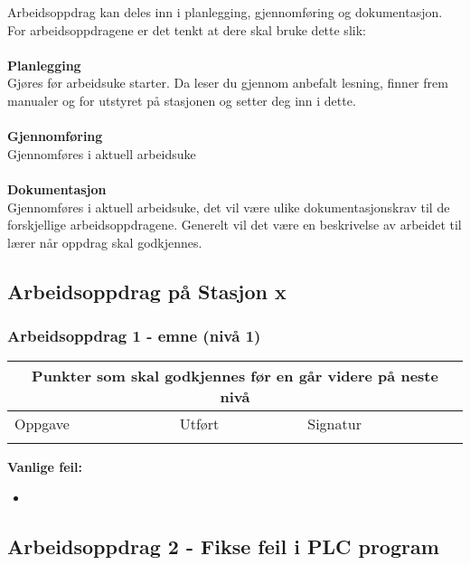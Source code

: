 Arbeidsoppdrag kan deles inn i planlegging, gjennomføring og dokumentasjon.\\
For arbeidsoppdragene er det tenkt at dere skal bruke dette slik:\\\\
\textbf{Planlegging}\\
Gjøres før arbeidsuke starter. Da leser du gjennom anbefalt lesning, finner frem manualer og for  utstyret på stasjonen og setter deg inn i dette.\\ \\
\textbf{Gjennomføring}\\
Gjennomføres i aktuell arbeidsuke\\\\

\textbf{Dokumentasjon}\\
Gjennomføres i aktuell arbeidsuke, det vil være ulike dokumentasjonskrav til de forskjellige arbeidsoppdragene. Generelt vil det være en beskrivelse av arbeidet til lærer når oppdrag skal godkjennes. \\


\newpage
\subsection*{Arbeidsoppdrag på Stasjon x}

\subsubsection*{Arbeidsoppdrag 1 -  emne (nivå 1)}

\begin{center} \begin{tabular}{ | m{8cm} | m{1cm}| m{2cm} | } 
\hline
\multicolumn{3}{|c|}{Punkter som skal godkjennes før en går videre på neste nivå} \\
	\hline
	Oppgave	& Utført & Signatur \\ 
	\hline
& & \\ 
	\hline
\end{tabular}
\end{center}

\textbf{Vanlige feil:}
\begin{itemize}[noitemsep]
	\item 
\end{itemize}
\newpage
\subsection*{Arbeidsoppdrag 2 - Fikse feil i PLC program}


